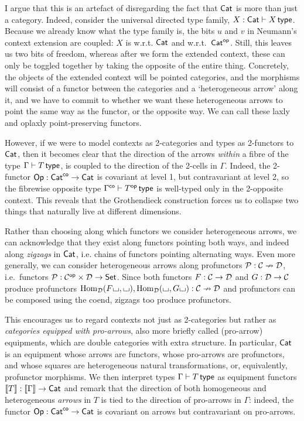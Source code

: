 \documentclass[twoLevelNum]{higherStructures} %
\begin{document}
I argue that this is an artefact of disregarding the fact that ${\mathsf{Cat}}$ is more than just a category.
Indeed, consider the universal directed type family, $X : {\mathsf{Cat}} \vdash X \,\mathsf{type}$.
Because we already know what the type family is, the bits $u$ and $v$ in Neumann's context extension are coupled: $X$ is \covarfib{} w.r.t. ${\mathsf{Cat}}$ and \contravarfib{} w.r.t.\ ${\mathsf{Cat}}^{\mathsf{op}}$.
Still, this leaves us two bits of freedom, whereas after we form the extended context, these can only be toggled together by taking the opposite of the entire thing.
Concretely, the objects of the extended context will be pointed categories, and the morphisms will consist of a functor between the categories and a `heterogeneous arrow' along it, and we have to commit to whether we want these heterogeneous arrows to point the same way as the functor, or the opposite way.
We can call these laxly and oplaxly point-preserving functors.

However, if we were to model contexts as 2-categories and types as 2-functors to ${\mathsf{Cat}}$, then it becomes clear that the direction of the arrows \emph{within} a fibre of the type $\Gamma \vdash T \,\mathsf{type}$, is coupled to the direction of the 2-cells in $\Gamma$.
Indeed, the 2-functor ${\mathsf{Op}} : {\mathsf{Cat}}^{\mathsf{co}} \to {\mathsf{Cat}}$ is covariant at level 1, but contravariant at level 2, so the fibrewise opposite type $\Gamma^{\mathsf{co}} \vdash T^{\mathsf{op}} \,\mathsf{type}$ is well-typed only in the 2-opposite context.
This reveals that the Grothendieck construction forces us to collapse two things that naturally live at different dimensions.

Rather than choosing along which functors we consider heterogeneous arrows, we can acknowledge that they exist along functors pointing both ways, and indeed along \emph{zigzags} in ${\mathsf{Cat}}$, i.e. chains of functors pointing alternating ways.
Even more generally, we can consider heterogeneous arrows along profunctors ${\mathcal{P}} : {\mathcal{C}} \nrightarrow {\mathcal{D}}$, i.e.\ functors ${\mathcal{P}} : {\mathcal{C}}^{\mathsf{op}} \times {\mathcal{D}} \to {\mathsf{Set}}$.
Since both functors $F : {\mathcal{C}} \to {\mathcal{D}}$ and $G : {\mathcal{D}} \to {\mathcal{C}}$ produce profunctors ${\mathrm{Hom}}_{\mathcal{D}}(F{\llcorner\hspace{-.4ex}\lrcorner}, {\llcorner\hspace{-.4ex}\lrcorner}), {\mathrm{Hom}}_{\mathcal{D}}({\llcorner\hspace{-.4ex}\lrcorner}, G{\llcorner\hspace{-.4ex}\lrcorner}) : {\mathcal{C}} \nrightarrow {\mathcal{D}}$ and profunctors can be composed using the coend, zigzags too produce profunctors.

This encourages us to regard contexts not just as 2-categories but rather as \emph{categories equipped with pro-arrows}, also more briefly called (pro-arrow) equipments, which are double categories with extra structure.
In particular, ${\mathsf{Cat}}$ is an equipment whose arrows are functors, whose pro-arrows are profunctors, and whose squares are heterogeneous natural transformations, or, equivalently, profunctor morphisms.
We then interpret types $\Gamma \vdash T \,\mathsf{type}$ as equipment functors $\mathopen{}\left\llbracket T \right\rrbracket\mathclose{} : \mathopen{}\left\llbracket \Gamma \right\rrbracket\mathclose{} \to {\mathsf{Cat}}$ and remark that the direction of both homogeneous and heterogeneous \emph{arrows} in $T$ is tied to the direction of pro-arrows in $\Gamma$: indeed, the functor ${\mathsf{Op}} : {\mathsf{Cat}}^{\mathsf{co}} \to {\mathsf{Cat}}$ is covariant on arrows but contravariant on pro-arrows.
\end{document}
